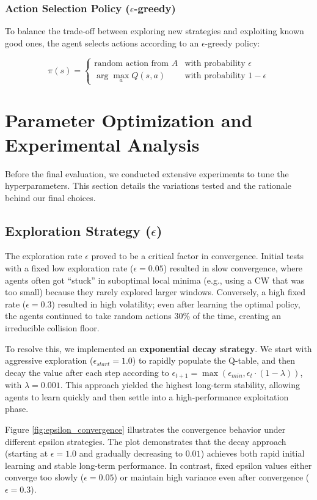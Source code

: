 \documentclass[12pt,a4paper,oneside]{article}
\theoremstyle{definition}
\begin{document}
\subsubsection{Action Selection Policy ($\epsilon$-greedy)}
To balance the trade-off between exploring new strategies and exploiting known good ones, the agent selects actions according to an $\epsilon$-greedy policy:

\[ \pi(s) = \begin{cases} \text{random action from } A & \text{with probability } \epsilon \\ \arg\max_{a} Q(s, a) & \text{with probability } 1 - \epsilon \end{cases} \]

\section{Parameter Optimization and Experimental Analysis}

Before the final evaluation, we conducted extensive experiments to tune the hyperparameters. This section details the variations tested and the rationale behind our final choices.

\subsection{Exploration Strategy ($\epsilon$)}
The exploration rate $\epsilon$ proved to be a critical factor in convergence. Initial tests with a fixed low exploration rate ($\epsilon = 0.05$) resulted in slow convergence, where agents often got ``stuck'' in suboptimal local minima (e.g., using a CW that was too small) because they rarely explored larger windows. Conversely, a high fixed rate ($\epsilon = 0.3$) resulted in high volatility; even after learning the optimal policy, the agents continued to take random actions 30\% of the time, creating an irreducible collision floor.

To resolve this, we implemented an \textbf{exponential decay strategy}. We start with aggressive exploration ($\epsilon_{start}=1.0$) to rapidly populate the Q-table, and then decay the value after each step according to $\epsilon_{t+1} = \max(\epsilon_{min}, \epsilon_t \cdot (1 - \lambda))$, with $\lambda=0.001$. This approach yielded the highest long-term stability, allowing agents to learn quickly and then settle into a high-performance exploitation phase.

Figure \ref{fig:epsilon_convergence} illustrates the convergence behavior under different epsilon strategies. The plot demonstrates that the decay approach (starting at $\epsilon=1.0$ and gradually decreasing to $0.01$) achieves both rapid initial learning and stable long-term performance. In contrast, fixed epsilon values either converge too slowly ($\epsilon=0.05$) or maintain high variance even after convergence ($\epsilon=0.3$).
\end{document}
